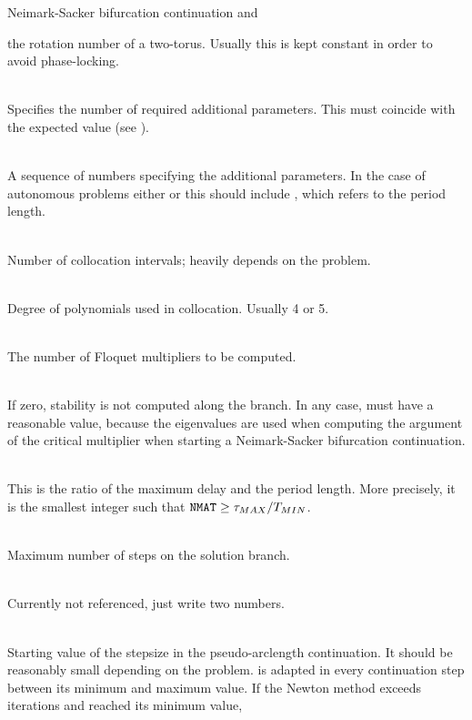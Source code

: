 \documentclass[10pt,a4paper]{ddedoc}
\begin{document}
\begin{description}
\begin{description}
Neimark-Sacker bifurcation continuation and
\item[\funp{I2} -] the rotation number of a two-torus. Usually this is kept
constant in order to avoid phase-locking.
\end{description}
%
\item[\funp{NPARX}] ~\\
Specifies the number of required additional parameters. This must coincide with
the expected value (see ).
%
\item[\funp{PARX}] ~\\
A sequence of numbers specifying the additional parameters. In
the case of autonomous problems either  or this should include
, which refers to the period length.
%
\item[\funp{NINT}] ~\\
Number of collocation intervals; heavily depends on the problem.
%
\item[\funp{NDEG}] ~\\
Degree of polynomials used in collocation. Usually 4 or 5.
%
\item[\funp{NMUL}] ~\\
The number of Floquet multipliers to be computed.
%
\item[\funp{STAB}] ~\\
If zero, stability is not computed along the branch. In any case, 
must have a reasonable value, because the eigenvalues are used when computing
the argument of the critical multiplier when starting a Neimark-Sacker
bifurcation continuation.
%
\item[\funp{NMAT}] ~\\
This is the ratio of the maximum delay and the period length. More precisely, it
is the smallest integer such that ${\tt NMAT} \ge \tau_{MAX}/T_{MIN}$.
%
\item[\funp{STEPS}] ~\\
Maximum number of steps on the solution branch.
%
\item[\funp{CPMIN}, \funp{CPMAX}] ~\\
Currently not referenced, just write two numbers.
%
\item[\funp{DS}] ~\\
Starting value of the stepsize in the pseudo-arclength continuation.
It should be reasonably small depending on the problem.  is adapted in
every continuation step between its minimum and maximum value. If the Newton
method exceeds  iterations and  reached its minimum value,

\end{description}
\end{document}
